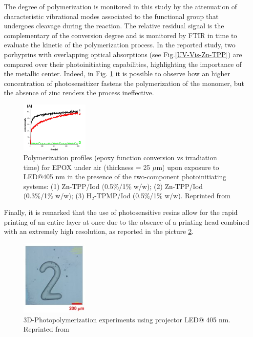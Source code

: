 \documentclass[twoside,twocolumn,9pt]{article}
\begin{document}
The degree of polymerization is monitored in this study by the attenuation of characteristic vibrational modes associated to the functional group that undergoes cleavage during the reaction.
The relative residual signal is the complementary of the conversion degree and is monitored by FTIR in time to evaluate the kinetic of the polymerization process.
In the reported study, two porhyprins with overlapping optical absorptions (see Fig.\ref{UV-Vis-Zn-TPP}) are compared over their photoinitiating capabilities, highlighting the importance of the metallic center.
Indeed, in Fig. \ref{conv-ZnTPP} it is possible to observe how an higher concentration of photosensitizer fastens the polymerization of the monomer, but the absence of zinc renders the process ineffective.
\begin{figure}
	\centering
	\includegraphics[width=0.3\textwidth]{conv-Zn-TPP}
	\caption{Polymerization profiles (epoxy function conversion vs irradiation time) for EPOX under air (thickness = 25 $\mu$m) upon exposure to
		LED@405 nm in the presence of the two-component photoinitiating systems: (1) Zn-TPP/Iod (0.5\%/1\% w/w); (2) Zn-TPP/Iod (0.3\%/1\% w/w);
		(3) H$_{2}$-TPMP/Iod (0.5\%/1\% w/w). Reprinted from \citet{al_mousawi_zinc_2017}}
	\label{conv-ZnTPP}
\end{figure}
Finally, it is remarked that the use of photosensitive resins allow for the rapid printing of an entire layer at once due to the absence of a printing head combined with an extremely high resolution, as reported in the picture \ref{print}.
\begin{figure}
	\centering
	\includegraphics[width=0.3\textwidth]{printed}
	\caption{3D-Photopolymerization experiments using projector LED@ 405 nm. Reprinted from \citet{al_mousawi_zinc_2017}}
	\label{print}
\end{figure}
\end{document}
